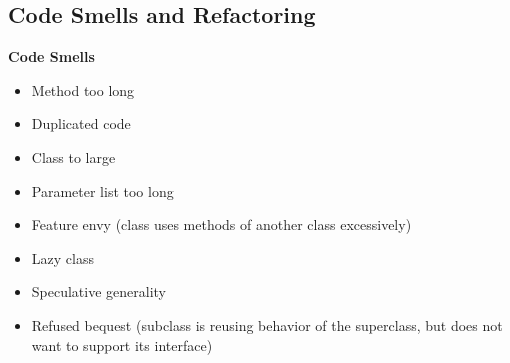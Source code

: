 \subsection{Code Smells and Refactoring}
\textbf{Code Smells}
\begin{itemize}
  \item Method too long
  \item Duplicated code
  \item Class to large
  \item Parameter list too long
  \item Feature envy (class uses methods of another class excessively)
  \item Lazy class
  \item Speculative generality
  \item Refused bequest (subclass is reusing behavior of the superclass, but does not want to support its interface)
\end{itemize}

